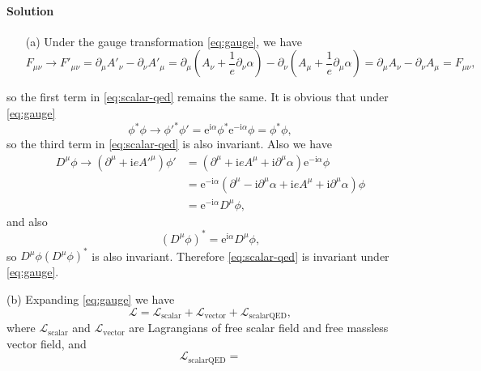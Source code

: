 \documentclass[hyperref, a4paper]{article}
\newcommand*{\ii}{\mathrm{i}}
\newcommand*{\ee}{\mathrm{e}}
\begin{document}
\paragraph{Solution} \begin{itemize}
\item[(a)] Under the gauge transformation \eqref{eq:gauge}, we have 
\[
    F_{\mu \nu}  \to 
    F'_{\mu \nu} = \partial_\mu A'_\nu - \partial_\nu A'_\mu
    = \partial_\mu \left(A_\nu + \frac{1}{e} \partial_\nu \alpha\right) 
    - \partial_\nu \left(A_\mu + \frac{1}{e} \partial_\mu \alpha\right)
    = \partial_\mu A_\nu - \partial_\nu A_\mu = F_{\mu \nu},
\] 
\end{itemize}
so the first term in \eqref{eq:scalar-qed} remains the same. It is obvious that under \eqref{eq:gauge}
\[
    \phi^* \phi \to \phi'^* \phi' = \ee^{\ii \alpha} \phi^* \ee^{- \ii \alpha} \phi = \phi^* \phi,
\]
so the third term in \eqref{eq:scalar-qed} is also invariant. Also we have
\[
    \begin{aligned}
        D^\mu \phi \to (\partial^\mu + \ii e A'^\mu) \phi' 
        &= (\partial^\mu + \ii e A^\mu + \ii \partial^\mu \alpha) \ee^{- \ii \alpha} \phi  \\
        &= \ee^{- \ii \alpha} (\partial^\mu - \ii \partial^\mu \alpha 
        + \ii e A^\mu + \ii \partial^\mu \alpha) \phi \\
        &= \ee^{- \ii \alpha} D^\mu \phi,
    \end{aligned}
\]
and also 
\[
    (D^\mu \phi)^* = \ee^{\ii \alpha} D^\mu \phi, 
\]
so $D^\mu \phi (D^\mu \phi)^*$ is also invariant. 
Therefore \eqref{eq:scalar-qed} is invariant under \eqref{eq:gauge}.

\item[(b)] Expanding \eqref{eq:gauge} we have 
\begin{equation}
    \mathcal{L} = \mathcal{L}_\text{scalar} + \mathcal{L}_\text{vector} + \mathcal{L}_\text{scalarQED},
\end{equation} 
where $\mathcal{L}_\text{scalar}$ and $\mathcal{L}_\text{vector}$ are Lagrangians of free scalar field and 
free massless vector field, and 
\begin{equation}
    \mathcal{L}_\text{scalarQED} = 
\end{equation}
\end{document}
